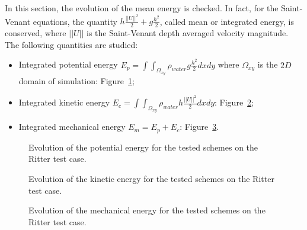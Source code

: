 In this section, the evolution of the mean energy is checked. In fact, for the Saint-Venant equations,
the quantity $h \frac{||U||^2}{2} + g \frac{h^2}{2}$, called mean or integrated energy, is conserved,
where $||U||$ is the Saint-Venant depth averaged velocity magnitude.
The following quantities are studied:
\begin{itemize}
\item Integrated potential energy \textbf{$E_p =\int\int_{\Omega_{xy}}\rho_{water} g \frac{h^2}{2} dxdy$} where $\Omega_{xy}$ is the $2D$ domain of simulation: Figure~\ref{fig:ritter:Ep};
\item Integrated kinetic energy \textbf{$E_c =\int\int_{\Omega_{xy}} \rho_{water} h \frac{||U||^2}{2} dxdy$}: Figure~\ref{fig:ritter:Ec};
\item Integrated mechanical energy \textbf{$E_m = E_p + E_c$}: Figure~\ref{fig:ritter:Em}.
\end{itemize}

\begin{figure}[H]
\centering
  \caption{Evolution of the potential energy for the tested schemes on the Ritter test case.}
\label{fig:ritter:Ep}
\end{figure}

\begin{figure}[H]
\centering
  \caption{Evolution of the kinetic energy for the tested schemes on the Ritter test case.}
\label{fig:ritter:Ec}
\end{figure}

\begin{figure}[H]
\centering
  \caption{Evolution of the mechanical energy for the tested schemes on the Ritter test case.}
\label{fig:ritter:Em}
\end{figure}

\newpage

